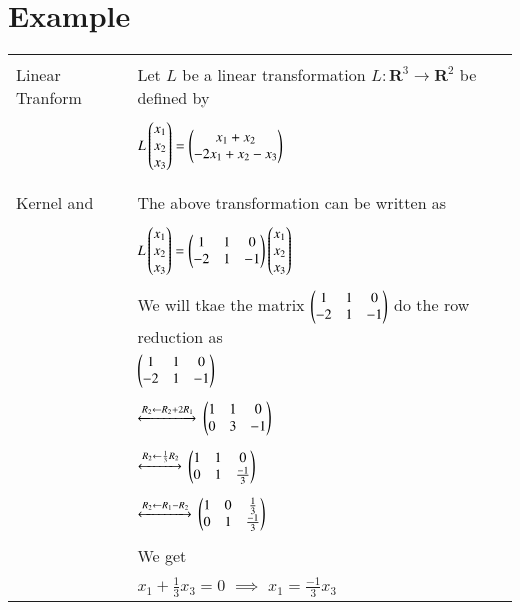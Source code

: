 \documentclass[journal,12pt]{IEEEtran}
\begin{document}
	\section{\textbf{Example}}
	\begin{longtable}{|l|l|}
		\hline
		\multirow{3}{*}{Linear Tranform }   
		& \\ 
		& Let $L$ be a linear transformation $L: \mathbf{R}^3 \rightarrow \mathbf{R}^2$ be defined by \\
		& \\
		& \qquad \qquad \qquad $L\begin{pmatrix}x_1\\x_2\\x_3\end{pmatrix} = \begin{pmatrix}x_1 + x_2 \\ -2x_1 + x_2 - x_3\end{pmatrix}$ \\
		& \\
		\hline
		\multirow{3}{*}{Kernel and}   
		& \\ 
		& The above transformation can be written as \\ Nullity
		& \\
		& \qquad \qquad \qquad $L\begin{pmatrix}x_1\\x_2\\x_3\end{pmatrix} = \begin{pmatrix}1&1&0\\ -2&1&-1\end{pmatrix}\begin{pmatrix}x_1\\x_2\\x_3\end{pmatrix}$ \\
		& \\
		& We will tkae the matrix $\begin{pmatrix}1&1&0\\ -2&1&-1\end{pmatrix}$ do the row reduction as \\
		& \qquad \qquad \qquad $\begin{pmatrix}1&1&0\\ -2&1&-1\end{pmatrix}$ \\
		& \\
		& \qquad $\xleftrightarrow[]{R_2 \leftarrow R_2 + 2R_1}$ $\begin{pmatrix}1&1&0\\ 0&3&-1\end{pmatrix}$ \\
		& \\
		& \qquad $\xleftrightarrow[]{R_2 \leftarrow \frac{1}{3}R_2}$ $\begin{pmatrix}1&1&0\\ 0&1&\frac{-1}{3}\end{pmatrix}$ \\
		& \\
		& \qquad $\xleftrightarrow[]{R_2 \leftarrow R_1 - R_2}$ $\begin{pmatrix}1&0&\frac{1}{3}\\ 0&1&\frac{-1}{3}\end{pmatrix}$ \\
		& \\
		& We get \\
		& \qquad \qquad $x_1 + \frac{1}{3}x_3 = 0$ $\implies$ $x_1 = \frac{-1}{3}x_3$ \\

\end{longtable}
\end{document}
